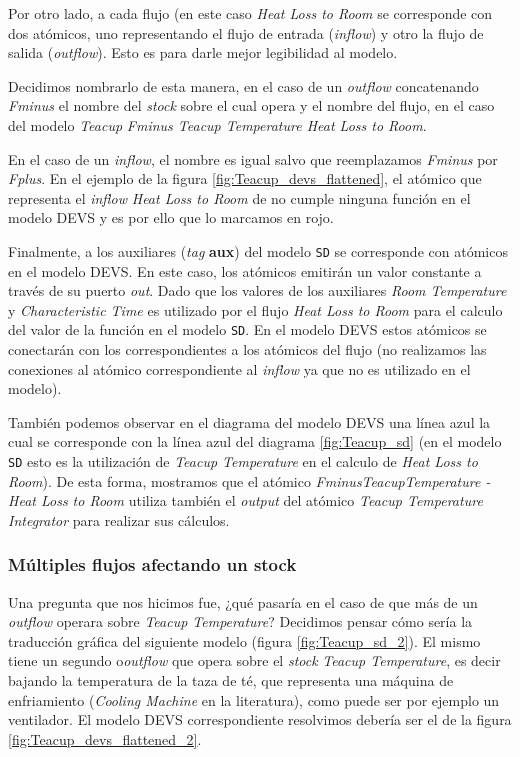 Por otro lado, a cada flujo (en este caso \textit{Heat Loss to Room} se corresponde con dos atómicos, uno representando el flujo de entrada (\textit{inflow}) y otro la flujo de salida (\textit{outflow}). Esto es para darle mejor legibilidad al modelo.

Decidimos nombrarlo de esta manera, en el caso de un \textit{outflow} concatenando \textit{Fminus} el nombre del \textit{stock} sobre el cual opera y el nombre del flujo, en el caso del modelo \textit{Teacup} \textit{Fminus Teacup Temperature Heat Loss to Room}.

En el caso de un \textit{inflow}, el nombre es igual salvo que reemplazamos \textit{Fminus} por \textit{Fplus}. En el ejemplo de la figura \ref{fig:Teacup_devs_flattened}, el atómico que representa el \textit{inflow} \textit{Heat Loss to Room} de no cumple ninguna función en el modelo DEVS y es por ello que lo marcamos en rojo. 

Finalmente, a los auxiliares (\textit{tag} \textbf{aux}) del modelo \texttt{SD} se corresponde con atómicos en el modelo DEVS. En este caso, los atómicos emitirán un valor constante a través de su puerto \textit{out}. Dado que los valores de los auxiliares \textit{Room Temperature} y \textit{Characteristic Time} es utilizado por el flujo \textit{Heat Loss to Room} para el calculo del valor de la función en el modelo \texttt{SD}. En el modelo DEVS estos atómicos se conectarán con los correspondientes a los atómicos del flujo (no realizamos las conexiones al atómico correspondiente al \textit{inflow} ya que no es utilizado en el modelo).

También podemos observar en el diagrama del modelo DEVS una línea azul la cual se corresponde con la línea azul del diagrama \ref{fig:Teacup_sd} (en el modelo \texttt{SD} esto es la utilización de \textit{Teacup Temperature} en el calculo de \textit{Heat Loss to Room}). De esta forma, mostramos que el atómico \textit{FminusTeacupTemperature - Heat Loss to Room} utiliza también el \textit{output} del atómico \textit{Teacup Temperature Integrator} para realizar sus cálculos. 

\subsubsection{Múltiples flujos afectando un stock}
Una pregunta que nos hicimos fue, ¿qué pasaría en el caso de que más de un \textit{outflow} operara sobre \textit{Teacup Temperature}?
Decidimos pensar cómo sería la traducción gráfica del siguiente modelo (figura \ref{fig:Teacup_sd_2}). El mismo tiene un segundo o\textit{outflow} que opera sobre el \textit{stock} \textit{Teacup Temperature}, es decir bajando la temperatura de la taza de té, que representa una máquina de enfriamiento (\textit{Cooling Machine} en la literatura), como puede ser por ejemplo un ventilador. El modelo DEVS correspondiente resolvimos debería ser el de la figura \ref{fig:Teacup_devs_flattened_2}. 

